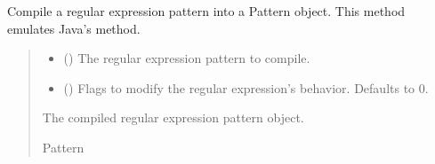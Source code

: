 \documentclass[letterpaper,10pt,english]{sphinxmanual}
\begin{document}
\begin{fulllineitems}

\begin{fulllineitems}
\label{\detokenize{apache_commons_validator_python.util:apache_commons_validator_python.util.regex.Regex.compile}}
\pysigstartsignatures
{}
\pysigstopsignatures
\sphinxAtStartPar
Compile a regular expression pattern into a Pattern object. This method
emulates Java’s  method.
\begin{quote}\begin{description}
\begin{itemize}
\item {} 
\sphinxAtStartPar
{} () \textendash{} The regular expression pattern to compile.

\item {} 
\sphinxAtStartPar
{} (\sphinxstyleliteralemphasis{\sphinxupquote{, }}) \textendash{} Flags to modify the regular expression’s behavior. Defaults to 0.

\end{itemize}

\sphinxAtStartPar
The compiled regular expression pattern object.

\sphinxAtStartPar
Pattern

\end{description}\end{quote}

\end{fulllineitems}



\end{fulllineitems}
\end{document}
